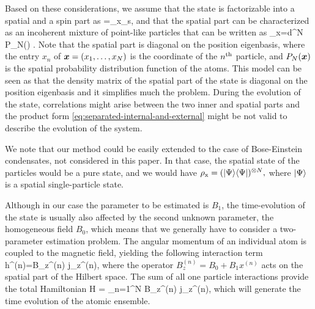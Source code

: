 Based on these considerations, we assume that the state is factorizable into a spatial and a spin part as
\be
\label{eq:separated-internal-and-external}
\rho=\rho_{{\rm x}}\otimes\rho_{{\rm s}},
\ee
and that the spatial part can be characterized as an incoherent mixture of point-like particles that can be written as
\be
  \label{eq:thermal-state}
  \rho_{\rm x}=\int d^N\, P_N() .
\ee
Note that the spatial part is diagonal on the position eigenbasis, where the entry $x_n$ of $\boldsymbol{x} =(x_1,\dots,x_N)$ is the coordinate of the $n^{\rm th}$ particle, and $P_N(\boldsymbol{x})$ is the spatial probability distribution function of the atoms.
This model can be seen as that the density matrix of the spatial part of the state is diagonal on the position eigenbasis and it simplifies much the problem.
During the evolution of the state, correlations might arise between the two inner and spatial parts and the product form \eqref{eq:separated-internal-and-external} might be not valid to describe the evolution of the system.

We note that our method could be easily extended to the case of Bose-Einstein condensates, not considered in this paper. In that case, the spatial state of the particles would be a pure state, and we would have $\rho_{\rm x}=(\vert\Psi\rangle\langle\Psi\vert )^{\otimes N},$ where $\vert \Psi \rangle$ is a spatial single-particle state.

Although in our case the parameter to be estimated is $B_1$,
the time-evolution of the state is usually also affected by the second unknown
parameter, the homogeneous field $B_0$, which means that we generally have to
consider a two-parameter estimation problem.
The angular momentum of an individual atom is
coupled to the magnetic field, yielding the following
interaction term
\be
h^{(n)}=\gamma B_z^{(n)} \otimes j_z^{(n)},
\ee
where the operator $B_z^{(n)}=B_0+B_1x^{(n)}$ acts on
the spatial part of the Hilbert space.
The sum  of all one particle interactions provide the total Hamiltonian
\be
\label{eq:Htot}
H = \gamma \sum_{n=1}^N B_z^{(n)} \otimes j_z^{(n)},
\ee
which will generate the time evolution of the atomic ensemble.

